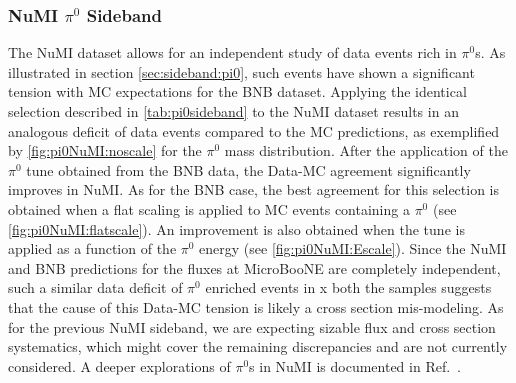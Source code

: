 \subsubsection{NuMI $\pi^0$ Sideband}
The NuMI dataset allows for an independent study of data events rich in $\pi^0$s. As illustrated in section \cref{sec:sideband:pi0}, such events have shown a significant tension with MC expectations for the BNB dataset. Applying the identical selection described in \cref{tab:pi0sideband} to the NuMI dataset results in an analogous deficit of data events compared to the MC predictions, as exemplified by  \cref{fig:pi0NuMI:noscale} for the $\pi^0$ mass distribution.  After the application of the $\pi^0$ tune obtained from the BNB data, the Data-MC agreement significantly improves in NuMI. As for the BNB case, the best agreement for this selection is obtained when a flat scaling is applied to MC events containing a $\pi^0$ (see \cref{fig:pi0NuMI:flatscale}). An improvement is also obtained when the tune is applied as a function of the $\pi^0$ energy (see \cref{fig:pi0NuMI:Escale}). 
Since the NuMI and BNB predictions for the fluxes at MicroBooNE are completely independent, such a similar data deficit of $\pi^0$ enriched events in x both the samples suggests that the cause of this Data-MC tension is likely a cross section mis-modeling. As for the previous NuMI sideband, we are expecting sizable flux and cross section systematics, which might cover the remaining discrepancies and are not currently considered.  A deeper explorations of $\pi^0$s in NuMI is documented in Ref.~\cite{bib:NuMIPi0}.

